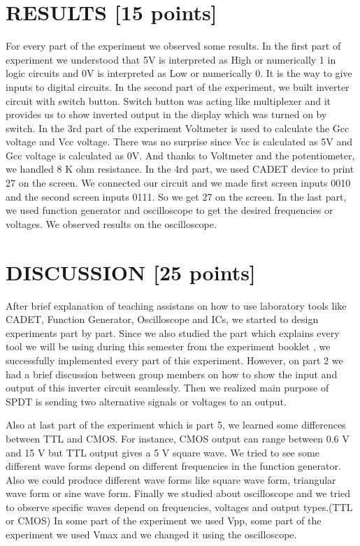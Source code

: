 \documentclass[pdftex,12pt,a4paper]{article}
\begin{document}
\newpage
\section{RESULTS [15 points]}
For every part of the experiment we observed some results. In the first part of experiment we understood that 5V is interpreted as High or numerically 1 in logic circuits and 0V is interpreted as Low or numerically 0. It is the way to give inputs to digital circuits. In the second part of the experiment, we built inverter circuit with switch button. Switch button was acting like multiplexer and it provides us to show inverted output in the display which was turned on by switch. In the 3rd part of the experiment Voltmeter is used to calculate the Gcc voltage and Vcc voltage. There was no surprise since Vcc is calculated as 5V and Gcc voltage is calculated as 0V. And thanks to Voltmeter and the potentiometer, we handled 8 K ohm resistance. In the 4rd part, we used CADET device to print 27 on the screen. We connected our circuit and we made first screen inputs 0010 and the second screen inputs 0111. So we get 27 on the screen. In the last part, we used function generator and oscilloscope to get the desired frequencies or voltages. We observed results on the oscilloscope.

\section{DISCUSSION [25 points]}
After brief explanation of teaching assistans on how to use laboratory tools like CADET, Function Generator, Oscilloscope and ICs, we started to design experiments part by part. 
Since we also studied the part which explains every tool we will be using during this semester from the experiment booklet , we successfully implemented every part of this experiment. However, on part 2 we had a brief discussion between group members on how to show the input and output of this inverter circuit seamlessly. Then we realized main purpose of SPDT is sending two alternative signals or voltages to an output.

Also at last part of the experiment which is part 5, we learned some differences between TTL and CMOS. 
For instance, CMOS output can range between 0.6 V and 15 V but TTL output gives a 5 V square wave.
We tried to see some different wave forms depend on different frequencies in the function generator. Also we could
produce different wave forms like square wave form, triangular wave form or sine wave form. Finally we studied 
about oscilloscope and we tried to observe specific waves depend on frequencies, voltages and output types.(TTL or CMOS)
In some part of the experiment we used Vpp, some part of the experiment we used Vmax and we changed it using the oscilloscope.
\end{document}
